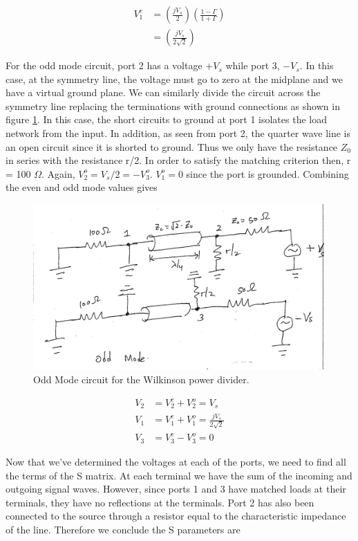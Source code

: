 \documentclass[twocolumn, aps, apl]{revtex4-1}
\begin{document}
\begin{align*}
    V_1^e &= \left(\frac{j V_s}{2}\right) \left(\frac{1 - \Gamma}{1 + \Gamma}\right) \\
    &= \left(\frac{j V_s}{2 \sqrt{2}}\right)
\end{align*}

For the odd mode circuit, port 2 has a voltage $+V_s$ while port 3, $-V_s$. In this case, at the symmetry line, the voltage must go to zero at the midplane and we have a virtual ground plane. We can similarly divide the circuit across the symmetry line replacing the terminations with ground connections as shown in figure \ref{fig:oddmode}. In this case, the short circuits to ground at port 1 isolates the load network from the input. In addition, as seen from port 2, the quarter wave line is an open circuit since it is shorted to ground. Thus we only have the resistance $Z_0$ in series with the resistance r/2. In order to satisfy the matching criterion then, r = 100 $\Omega$. Again, $V_2^o = V_s/2 = - V_3^o$. $V_1^o = 0$ since the port is grounded. Combining the even and odd mode values gives

\begin{figure}[!htbp]
    \centering
    \includegraphics[scale=0.2]{OddMode.png}
    \caption{Odd Mode circuit for the Wilkinson power divider. }
    \label{fig:oddmode}
\end{figure}

\begin{align*}
    V_2 &= V_2^e + V_2^o = V_s \\
    V_1 &= V_1^e + V_1^o = \frac{j V_s}{2 \sqrt{2}} \\
    V_3 &= V_3^e - V_3^o = 0
\end{align*}

Now that we've determined the voltages at each of the ports, we need to find all the terms of the S matrix. At each terminal we have the sum of the incoming and outgoing signal waves. However, since ports 1 and 3 have matched loads at their terminals, they have no reflections at the terminals. Port 2 has also been connected to the source through a resistor equal to the characteristic impedance of the line. Therefore we conclude the S parameters are
\end{document}
